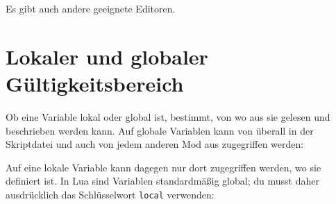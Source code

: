 Es gibt auch andere geeignete Editoren.

\section{Lokaler und globaler
Gültigkeitsbereich}\label{lokaler-und-globaler-guxfcltigkeitsbereich}

Ob eine Variable lokal oder global ist, bestimmt, von wo aus sie gelesen
und beschrieben werden kann. Auf globale Variablen kann von überall in
der Skriptdatei und auch von jedem anderen Mod aus zugegriffen werden:

\begin{Shaded}
\begin{Highlighting}[]
\OperatorTok{()}
     \OperatorTok{=} 

\OperatorTok{()}
    \OperatorTok{(}\OperatorTok{(}\OperatorTok{))} 

\OperatorTok{()}
\OperatorTok{()}
\end{Highlighting}
\end{Shaded}

Auf eine lokale Variable kann dagegen nur dort zugegriffen werden, wo
sie definiert ist. In Lua sind Variablen standardmäßig global; du musst
daher ausdrücklich das Schlüsselwort \texttt{local} verwenden:

\begin{Shaded}
\begin{Highlighting}[]
  \OperatorTok{=} 

\OperatorTok{()}
      \OperatorTok{=}  \OperatorTok{+} 

      \OperatorTok{==}  
          \OperatorTok{=}  \OperatorTok{+} 
\end{Highlighting}
\end{Shaded}

